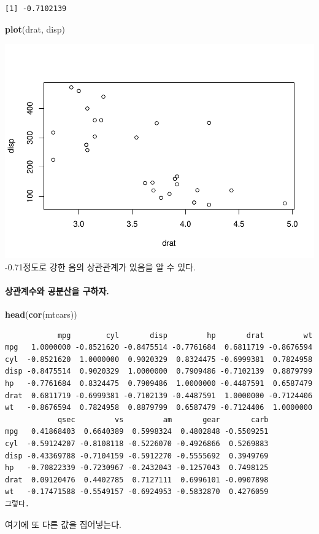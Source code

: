\documentclass[]{article}
\newenvironment{Shaded}{\begin{snugshade}}{\end{snugshade}}
\newcommand{\KeywordTok}[1]{\textcolor[rgb]{0.13,0.29,0.53}{\textbf{#1}}}
\newcommand{\NormalTok}[1]{#1}
\let\oldparagraph\paragraph
\renewcommand{\paragraph}[1]{\oldparagraph{#1}\mbox{}}
\begin{document}
\begin{verbatim}
[1] -0.7102139
\end{verbatim}

\begin{Shaded}
\begin{Highlighting}[]
\KeywordTok{plot}\NormalTok{(drat, disp)}
\end{Highlighting}
\end{Shaded}

\includegraphics{04.02.01.basic_statistical_analysis_files/figure-latex/unnamed-chunk-3-1.pdf}
-0.71정도로 강한 음의 상관관계가 있음을 알 수 있다.



\paragraph{상관계수와 공분산을 구하자.}\label{--.}

\begin{Shaded}
\begin{Highlighting}[]
\KeywordTok{head}\NormalTok{(}\KeywordTok{cor}\NormalTok{(mtcars))}
\end{Highlighting}
\end{Shaded}

\begin{verbatim}
            mpg        cyl       disp         hp       drat         wt
mpg   1.0000000 -0.8521620 -0.8475514 -0.7761684  0.6811719 -0.8676594
cyl  -0.8521620  1.0000000  0.9020329  0.8324475 -0.6999381  0.7824958
disp -0.8475514  0.9020329  1.0000000  0.7909486 -0.7102139  0.8879799
hp   -0.7761684  0.8324475  0.7909486  1.0000000 -0.4487591  0.6587479
drat  0.6811719 -0.6999381 -0.7102139 -0.4487591  1.0000000 -0.7124406
wt   -0.8676594  0.7824958  0.8879799  0.6587479 -0.7124406  1.0000000
            qsec         vs         am       gear       carb
mpg   0.41868403  0.6640389  0.5998324  0.4802848 -0.5509251
cyl  -0.59124207 -0.8108118 -0.5226070 -0.4926866  0.5269883
disp -0.43369788 -0.7104159 -0.5912270 -0.5555692  0.3949769
hp   -0.70822339 -0.7230967 -0.2432043 -0.1257043  0.7498125
drat  0.09120476  0.4402785  0.7127111  0.6996101 -0.0907898
wt   -0.17471588 -0.5549157 -0.6924953 -0.5832870  0.4276059
그렇다. 
\end{verbatim}
여기에 또 다른 값을 집어넣는다. 
\end{document}
